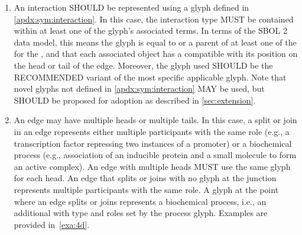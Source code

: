 \begin{enumerate}
\item An interaction SHOULD be represented using a glyph defined in \ref{apdx:sym:interaction}.  In this case, the interaction type MUST be contained within at least one of the glyph's associated terms.
In terms of the SBOL 2 data model, this means the glyph is equal to or a parent of at least one of the  for the , and that each associated  object has a  compatible with its position on the head or tail of the edge.
	Moreover, the glyph used SHOULD be the RECOMMENDED variant of the most specific applicable glyph.  Note that novel glyphs not defined in \ref{apdx:sym:interaction} MAY be used, but SHOULD be proposed for adoption as described in \ref{sec:extension}.

\item An edge may have multiple heads or multiple tails. 
In this case, a split or join in an edge represents either multiple participants with the same role (e.g., a transcription factor repressing two instances of a promoter) or a biochemical process (e.g., association of an inducible protein and a small molecule to form an active complex).  
An edge with multiple heads MUST use the same glyph for each head.
An edge that splits or joins with no glyph at the junction represents multiple participants with the same role.
A glyph at the point where an edge splits or joins represents a biochemical process, i.e., an additional  with type and roles set by the process glyph. 
Examples are provided in~\ref{exa:4d}.


\end{enumerate}
